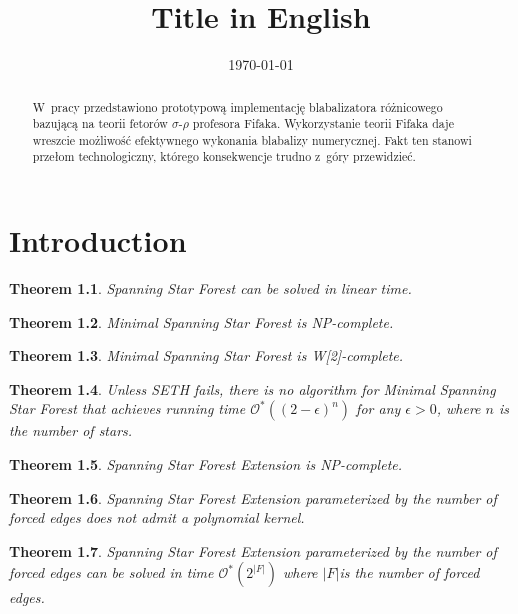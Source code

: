\documentclass[en]{pracamgr}
\title{Title in English}
\date{\monthyeardate\today}
\newtheorem{theorem}{Theorem}
\newcommand{\ssfp}{{\sc Spanning Star Forest}}
\newcommand{\mssfp}{{\sc Minimal Spanning Star Forest}}
\newcommand{\ssfep}{{\sc Spanning Star Forest Extension}}
\begin{document}
\maketitle

\begin{abstract}
  W~pracy przedstawiono prototypową implementację blabalizatora
  różnicowego bazującą na teorii fetorów $\sigma$-$\rho$ profesora
  Fifaka.  Wykorzystanie teorii Fifaka daje wreszcie możliwość
  efektywnego wykonania blabalizy numerycznej.  Fakt ten stanowi
  przełom technologiczny, którego konsekwencje trudno z~góry
  przewidzieć.
\end{abstract}

\tableofcontents

\chapter{Introduction}

\begin{theorem}\label{ssfp-thm}
	\ssfp{} can be solved in linear time.
\end{theorem}

\begin{theorem}
	\mssfp{} is \textup{NP}-complete.
\end{theorem}

\begin{theorem}
	\mssfp{} is \textup{W[2]}-complete.
\end{theorem}

\begin{theorem}
	Unless SETH fails, there is no algorithm for \mssfp{} that achieves running time $\mathcal{O}^*((2-\epsilon)^n)$ for any $\epsilon > 0$, where $n$ is the number of stars.
\end{theorem}

\begin{theorem}
	\ssfep{} is \textup{NP}-complete.
\end{theorem}

\begin{theorem}
	\ssfep{} parameterized by the number of forced edges does not admit a polynomial kernel.
\end{theorem}

\begin{theorem}
	\ssfep{} parameterized by the number of forced edges can be solved in time $\mathcal{O}^*(2^{|F|})$ where $|F|$is the number of forced edges.
\end{theorem}
\end{document}
